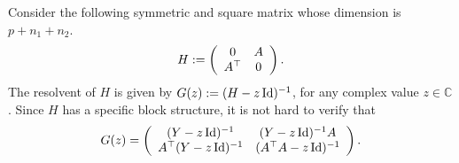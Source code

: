 Consider the following symmetric and square matrix whose dimension is $p + n_1 + n_2$.
 \begin{equation}\label{linearize_block}
    H \define \left( {\begin{array}{*{20}c}
   0 & A  \\
   A^{\top} & 0
   \end{array}} \right).
 \end{equation}
The resolvent of $H$ is given by $G(z) := (H - z\operatorname{Id})^{-1}$, for any complex value $z\in \mathbb C$.
Since $H$ has a specific block structure, it is not hard to verify that
	\begin{equation*} %
	  G(z) =  \left( {\begin{array}{*{20}c}
			(Y - z\id)^{-1} & (Y - z\id)^{-1} A  \\
      A^\top (Y - z\id)^{-1} & (A^\top A - z\id)^{-1}
		\end{array}} \right).%
  \end{equation*}

